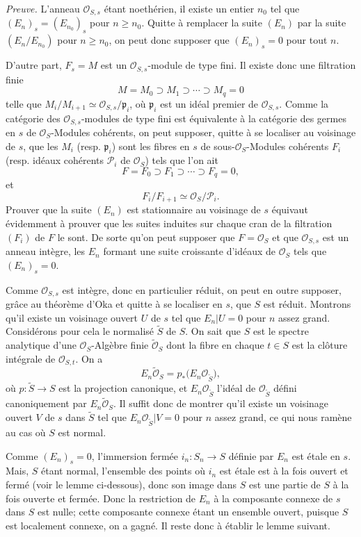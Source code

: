 \documentclass[11pt]{article}
\begin{document}
\emph{Preuve.} L'anneau $\mathcal O_{S,s}$ étant noethérien, il existe un entier $n_0$ tel que $(E_n)_s=(E_{n_0})_s$ pour $n\geq n_0$. Quitte à remplacer la suite $(E_n)$ par la suite $(E_n/E_{n_0})$ pour $n\geq n_0$, on peut donc supposer que $(E_n)_s=0$ pour tout $n$.

D'autre part, $F_s=M$ est un $\mathcal O_{S,s}$-module de type fini. Il existe donc une filtration finie
\[
M=M_0\supset M_1\supset\cdots\supset M_q=0
\]
telle que $M_i/M_{i+1}\simeq \mathcal O_{S,s}/\mathfrak p_i$, où $\mathfrak p_i$ est un idéal premier de $\mathcal O_{S,s}$. Comme la catégorie des $\mathcal O_{S,s}$-modules de type fini est équivalente à la catégorie des germes en $s$ de $\mathcal O_S$-Modules cohérents, on peut supposer, quitte à se localiser au voisinage de $s$, que les $M_i$ (resp. $\mathfrak p_i$) sont les fibres en $s$ de sous-$\mathcal O_S$-Modules cohérents $F_i$ (resp. idéaux cohérents $\mathcal P_i$ de $\mathcal O_S$) tels que l'on ait
\[
F=F_0\supset F_1\supset\cdots\supset F_q=0,
\]
et
\[
F_i/F_{i+1}\simeq \mathcal O_S/\mathcal P_i.
\]
Prouver que la suite $(E_n)$ est stationnaire au voisinage de $s$ équivaut évidemment à prouver que les suites induites sur chaque cran de la filtration $(F_i)$ de $F$ le sont. De sorte qu'on peut supposer que $F=\mathcal O_S$ et que $\mathcal O_{S,s}$ est un anneau intègre, les $E_n$ formant une suite croissante d'idéaux de $\mathcal O_S$ tels que $(E_n)_s=0$.

Comme $\mathcal O_{S,s}$ est intègre, donc en particulier réduit, on peut en outre supposer, grâce au théorème d'Oka et quitte à se localiser en $s$, que $S$ est réduit. Montrons qu'il existe un voisinage ouvert $U$ de $s$ tel que $E_n|U=0$ pour $n$ assez grand. Considérons pour cela le normalisé $\widetilde S$ de $S$. On sait que $S$ est le spectre analytique d'une $\mathcal O_S$-Algèbre finie $\widetilde{\mathcal O}_S$ dont la fibre en chaque $t\in S$ est la clôture intégrale de $\mathcal O_{S,t}$. On a
\[
E_n\widetilde{\mathcal O}_S
 =p_*\bigl(E_n\mathcal O_{\widetilde S}\bigr),
\]
où $p:\widetilde S\to S$ est la projection canonique, et $E_n\mathcal O_{\widetilde S}$ l'idéal de $\mathcal O_{\widetilde S}$ défini canoniquement par $E_n\widetilde{\mathcal O}_S$. Il suffit donc de montrer qu'il existe un voisinage ouvert $V$ de $s$ dans $\widetilde S$ tel que $E_n\mathcal O_{\widetilde S}|V=0$ pour $n$ assez grand, ce qui nous ramène au cas où $S$ est normal.

Comme $(E_n)_s=0$, l'immersion fermée $i_n:S_n\to S$ définie par $E_n$ est étale en $s$. Mais, $S$ étant normal, l'ensemble des points où $i_n$ est étale est à la fois ouvert et fermé (voir le lemme ci-dessous), donc son image dans $S$ est une partie de $S$ à la fois ouverte et fermée. Donc la restriction de $E_n$ à la composante connexe de $s$ dans $S$ est nulle; cette composante connexe étant un ensemble ouvert, puisque $S$ est localement connexe, on a gagné. Il reste donc à établir le lemme suivant.
\end{document}
